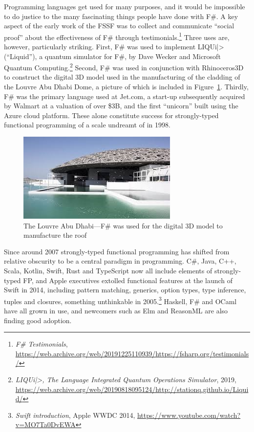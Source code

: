 \documentclass[acmsmall]{acmart}\settopmatter{}
\begin{document}
Programming languages get used for many purposes, and it would be impossible to do justice to the many fascinating
things people have done with F\#.  A key aspect of the early work of the FSSF was to collect and communicate
“social proof” about the effectiveness of F\# through testimonials.\footnote{\textit{F\# Testimonials}, \url{https://web.archive.org/web/20191225110939/https://fsharp.org/testimonials/}}
Three uses are, however, particularly striking.
First, F\# was used to implement LIQUi|> (“Liquid”), a quantum simulator for F\#, by Dave Wecker and Microsoft
Quantum Computing.\footnote{\textit{LIQUi|>, The Language Integrated Quantum Operations Simulator}, 2019, \url{https://web.archive.org/web/20190818095124/http://stationq.github.io/Liquid/}}
  Second, F\# was used in conjunction with Rhinoceros3D to construct the digital 3D model
used in the manufacturing of the cladding of the Louvre Abu Dhabi Dome, a picture of which is included in Figure~\ref{fig:fig4}.
Thirdly, F\# was the primary language used at Jet.com, a start-up subsequently acquired by Walmart at a valuation
of over \$3B, and the first “unicorn” built using the Azure cloud platform. These alone constitute success for
strongly-typed functional programming of a scale undreamt of in 1998.

\begin{figure}

  \includegraphics[width=0.8\linewidth]{fig4.jpg}
  \caption{The Louvre Abu Dhabi---F\# was used for the digital 3D model to manufacture the roof}
  \label{fig:fig4}

\end{figure}

Since around 2007 strongly-typed functional programming has shifted from relative obscurity to be a central paradigm
in programming. C\#, Java, C++, Scala, Kotlin, Swift, Rust and TypeScript now all include elements of
strongly-typed FP, and Apple executives extolled functional features at the launch of Swift in 2014, including
pattern matching, generics, option types, type inference, tuples and closures,
something unthinkable in 2005.\footnote{\textit{Swift introduction}, Apple WWDC 2014, \url{https://www.youtube.com/watch?v=MO7Ta0DvEWA}} Haskell,
F\# and OCaml have all grown in use, and newcomers such as Elm and ReasonML are also finding good adoption.
\end{document}
